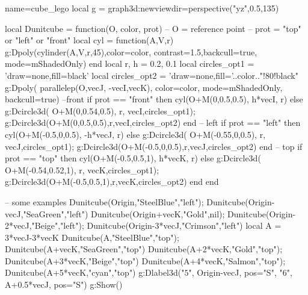 \documentclass[border=5pt]{standalone}%
\begin{document}
\begin{luadraw}{name=cube_lego}
local g = graph3d:new{viewdir=perspective("yz",0.5,135)}

local Dunitcube = function(O, color, prot)
    -- O = reference point
    -- prot = "top" or "left" or "front"
    local cyl = function(A,V,r)
        g:Dpoly(cylinder(A,V,r,45),{color=color, contrast=1.5,backcull=true, mode=mShadedOnly})
    end
    local r, h = 0.2, 0.1
    local circles_opt1 = 'draw=none,fill=black'
    local circles_opt2 = 'draw=none,fill='..color.."!80!black"
    g:Dpoly( parallelep(O,vecJ, -vecI,vecK), {color=color, mode=mShadedOnly, backcull=true})
    --front
    if prot == "front" then cyl(O+M(0,0.5,0.5), h*vecI, r)
    else g:Dcircle3d( O+M(0,0.54,0.5), r, vecI,circles_opt1); g:Dcircle3d(O+M(0,0.5,0.5),r,vecI,circles_opt2)
    end
    -- left
    if prot == "left" then cyl(O+M(-0.5,0,0.5), -h*vecJ, r)
    else g:Dcircle3d( O+M(-0.55,0,0.5), r, vecJ,circles_opt1); g:Dcircle3d(O+M(-0.5,0,0.5),r,vecJ,circles_opt2)
    end
    -- top
    if prot == "top" then cyl(O+M(-0.5,0.5,1), h*vecK, r)
    else g:Dcircle3d( O+M(-0.54,0.52,1), r, vecK,circles_opt1); g:Dcircle3d(O+M(-0.5,0.5,1),r,vecK,circles_opt2)
    end
end

-- some examples
Dunitcube(Origin,"SteelBlue","left"); Dunitcube(Origin-vecJ,"SeaGreen","left")
Dunitcube(Origin+vecK,"Gold",nil); Dunitcube(Origin-2*vecJ,"Beige","left"); 
Dunitcube(Origin-3*vecJ,"Crimson","left")
local A = 3*vecJ-3*vecK
Dunitcube(A,"SteelBlue","top"); Dunitcube(A+vecK,"SeaGreen","top")
Dunitcube(A+2*vecK,"Gold","top"); Dunitcube(A+3*vecK,"Beige","top")
Dunitcube(A+4*vecK,"Salmon","top"); Dunitcube(A+5*vecK,"cyan","top")
g:Dlabel3d("$5$", Origin-vecJ, {pos="S"}, "$6$", A+0.5*vecJ, {pos="S"})
g:Show()
\end{luadraw}
\end{document}

